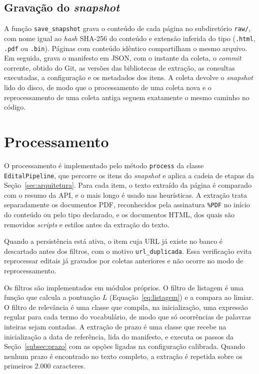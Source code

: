 \subsection{Gravação do \textit{snapshot}}

A função \texttt{save\_snapshot} grava o conteúdo de cada página no
subdiretório \texttt{raw/}, com nome igual ao \textit{hash} SHA-256 do conteúdo
e extensão inferida do tipo (\texttt{.html}, \texttt{.pdf} ou \texttt{.bin}).
Páginas com conteúdo idêntico compartilham o mesmo arquivo. Em seguida, grava
o manifesto em JSON, com o instante da coleta, o \textit{commit} corrente,
obtido do Git, as versões das bibliotecas de extração, as consultas
executadas, a configuração e os metadados dos itens. A coleta devolve o
\textit{snapshot} lido do disco, de modo que o processamento de uma coleta
nova e o reprocessamento de uma coleta antiga seguem exatamente o mesmo
caminho no código.

\section{Processamento}
\label{sec:impl_processamento}

O processamento é implementado pelo método \texttt{process} da classe
\texttt{EditalPipeline}, que percorre os itens do \textit{snapshot} e aplica a
cadeia de etapas da Seção~\ref{sec:arquitetura}. Para cada item, o texto
extraído da página é comparado com o resumo da API, e o mais longo é usado nas
heurísticas. A extração trata separadamente os documentos PDF, reconhecidos
pela assinatura \texttt{\%PDF} no início do conteúdo ou pelo tipo declarado, e
os documentos HTML, dos quais são removidos \textit{scripts} e estilos antes da
extração do texto.

Quando a persistência está ativa, o item cuja URL já existe no banco é
descartado antes dos filtros, com o motivo \texttt{url\_duplicada}. Essa
verificação evita reprocessar editais já gravados por coletas anteriores e
não ocorre no modo de reprocessamento.

Os filtros são implementados em módulos próprios. O filtro de listagem é uma
função que calcula a pontuação $L$ (Equação~\ref{eq:listagem}) e a compara ao
limiar. O filtro de relevância é uma classe que compila, na inicialização,
uma expressão regular para cada termo do vocabulário, de modo que só
ocorrências de palavras inteiras sejam contadas. A extração de prazo é uma
classe que recebe na inicialização a data de referência, lida do manifesto, e
executa os passos da Seção~\ref{subsec:prazo} com as opções ligadas na
configuração calibrada. Quando nenhum prazo é encontrado no texto completo,
a extração é repetida sobre os primeiros 2.000 caracteres.

